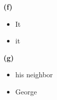 \documentclass[11pt]{article}
\renewcommand\part[1]{\vspace{.10in}\textbf{(#1)}}
\begin{document}
\part{f}
\begin{itemize}
  \item It
  \item it 	
\end{itemize}

\part{g}
\begin{itemize}
  \item his neighbor
  \item George 	
\end{itemize}
\end{document}
